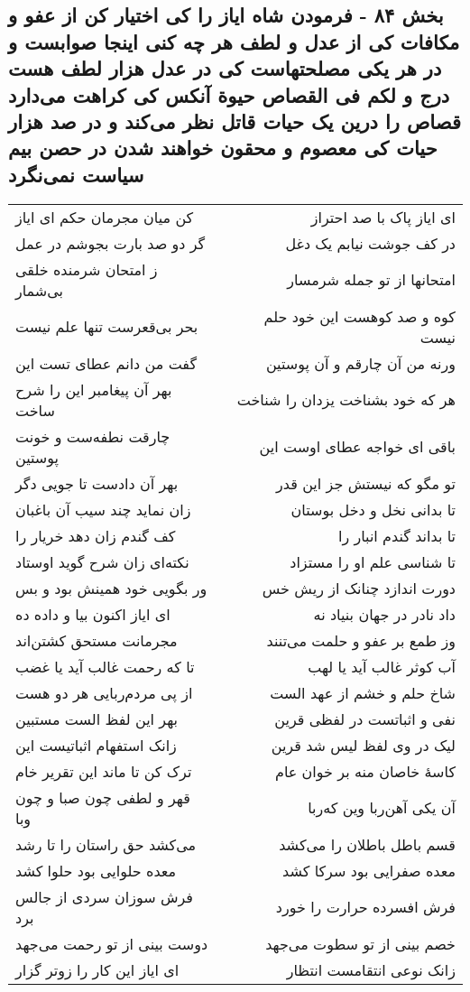\begin{center}
\section*{بخش ۸۴ - فرمودن شاه ایاز را کی اختیار کن از عفو و مکافات کی از عدل و لطف هر چه کنی اینجا صوابست و در هر یکی مصلحتهاست کی در عدل هزار لطف هست درج و لکم فی القصاص حیوة آنکس کی کراهت می‌دارد قصاص را درین یک حیات قاتل نظر می‌کند و در صد هزار حیات کی معصوم و محقون خواهند شدن در حصن بیم سیاست نمی‌نگرد}
\label{sec:sh084}
\begin{longtable}{l p{0.5cm} r}
کن میان مجرمان حکم ای ایاز
&&
ای ایاز پاک با صد احتراز
\\
گر دو صد بارت بجوشم در عمل
&&
در کف جوشت نیابم یک دغل
\\
ز امتحان شرمنده خلقی بی‌شمار
&&
امتحانها از تو جمله شرمسار
\\
بحر بی‌قعرست تنها علم نیست
&&
کوه و صد کوهست این خود حلم نیست
\\
گفت من دانم عطای تست این
&&
ورنه من آن چارقم و آن پوستین
\\
بهر آن پیغامبر این را شرح ساخت
&&
هر که خود بشناخت یزدان را شناخت
\\
چارقت نطفه‌ست و خونت پوستین
&&
باقی ای خواجه عطای اوست این
\\
بهر آن دادست تا جویی دگر
&&
تو مگو که نیستش جز این قدر
\\
زان نماید چند سیب آن باغبان
&&
تا بدانی نخل و دخل بوستان
\\
کف گندم زان دهد خریار را
&&
تا بداند گندم انبار را
\\
نکته‌ای زان شرح گوید اوستاد
&&
تا شناسی علم او را مستزاد
\\
ور بگویی خود همینش بود و بس
&&
دورت اندازد چنانک از ریش خس
\\
ای ایاز اکنون بیا و داده ده
&&
داد نادر در جهان بنیاد نه
\\
مجرمانت مستحق کشتن‌اند
&&
وز طمع بر عفو و حلمت می‌تنند
\\
تا که رحمت غالب آید یا غضب
&&
آب کوثر غالب آید یا لهب
\\
از پی مردم‌ربایی هر دو هست
&&
شاخ حلم و خشم از عهد الست
\\
بهر این لفظ الست مستبین
&&
نفی و اثباتست در لفظی قرین
\\
زانک استفهام اثباتیست این
&&
لیک در وی لفظ لیس شد قرین
\\
ترک کن تا ماند این تقریر خام
&&
کاسهٔ خاصان منه بر خوان عام
\\
قهر و لطفی چون صبا و چون وبا
&&
آن یکی آهن‌ربا وین که‌ربا
\\
می‌کشد حق راستان را تا رشد
&&
قسم باطل باطلان را می‌کشد
\\
معده حلوایی بود حلوا کشد
&&
معده صفرایی بود سرکا کشد
\\
فرش سوزان سردی از جالس برد
&&
فرش افسرده حرارت را خورد
\\
دوست بینی از تو رحمت می‌جهد
&&
خصم بینی از تو سطوت می‌جهد
\\
ای ایاز این کار را زوتر گزار
&&
زانک نوعی انتقامست انتظار
\\
\end{longtable}
\end{center}
